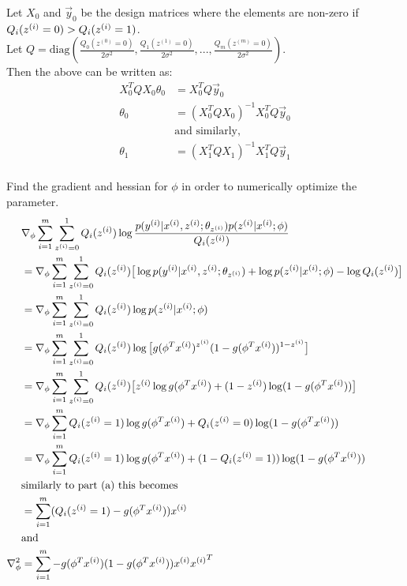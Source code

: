 \documentclass[11pt]{article}
\begin{document}
Let $X_0$ and $\vec{y}_0$ be the design matrices where the elements are non-zero if $Q_i(z^{(i)} = 0) > Q_i(z^{(i)} = 1)$.\\
Let $Q = \text{diag}(\frac{Q_0(z^{(0)}=0)}{2 \sigma^2},\frac{Q_1(z^{(1)}=0)}{2 \sigma^2},...,\frac{Q_m(z^{(m)}=0)}{2 \sigma^2})$.\\
Then the above can be written as:
\begin{align*}
    X_0^T Q X_0 \theta_0 &= X_0^T Q \vec{y}_0 \\
                \theta_0 &= (X_0^T Q X_0)^{-1} X_0^T Q \vec{y}_0 \\
                &\text{and similarly,}\\
                \theta_1 &= (X_1^T Q X_1)^{-1} X_1^T Q \vec{y}_1 \\
\end{align*}

Find the gradient and hessian for $\phi$ in order to numerically optimize the parameter.
\begin{align*}
    &\nabla_\phi \sum_{i=1}^m \sum_{z^{(i)}=0}^{1} Q_i(z^{(i)}) \log \frac{p(y^{(i)}|x^{(i)},z^{(i)};\theta_{z^{(i)}})p(z^{(i)}|x^{(i)};\phi)}{Q_i(z^{(i)})} \\
    &= \nabla_\phi \sum_{i=1}^m \sum_{z^{(i)}=0}^{1} Q_i(z^{(i)}) \big[ \log p(y^{(i)}|x^{(i)},z^{(i)};\theta_{z^{(i)}}) + \log p(z^{(i)}|x^{(i)};\phi) - \log Q_i(z^{(i)}) \big] \\
    &= \nabla_\phi \sum_{i=1}^m \sum_{z^{(i)}=0}^{1} Q_i(z^{(i)}) \log p(z^{(i)}|x^{(i)};\phi) \\
    &= \nabla_\phi \sum_{i=1}^m \sum_{z^{(i)}=0}^{1} Q_i(z^{(i)}) \log \big[ g(\phi^T x^{(i)})^{z^{(i)}} (1 - g(\phi^T x^{(i)}))^{1-z^{(i)}} \big] \\
    &= \nabla_\phi \sum_{i=1}^m \sum_{z^{(i)}=0}^{1} Q_i(z^{(i)}) \big[ z^{(i)} \log g(\phi^T x^{(i)}) + (1 - z^{(i)}) \log (1 - g(\phi^T x^{(i)})) \big] \\
    &= \nabla_\phi \sum_{i=1}^m Q_i(z^{(i)}=1) \log g(\phi^T x^{(i)}) + Q_i(z^{(i)}=0) \log (1 - g(\phi^T x^{(i)})) \\
    &= \nabla_\phi \sum_{i=1}^m Q_i(z^{(i)}=1) \log g(\phi^T x^{(i)}) + (1 - Q_i(z^{(i)}=1)) \log (1 - g(\phi^T x^{(i)})) \\
    &\text{similarly to part (a) this becomes} \\
    &= \sum_{i=1}^m (Q_i(z^{(i)}=1) - g(\phi^T x^{(i)})) x^{(i)} \\
    &\text{and} \\
    \nabla_\phi^2 &= \sum_{i=1}^m -g(\phi^T x^{(i)})(1-g(\phi^T x^{(i)})) x^{(i)} {x^{(i)}}^T \\
\end{align*}
\end{document}
